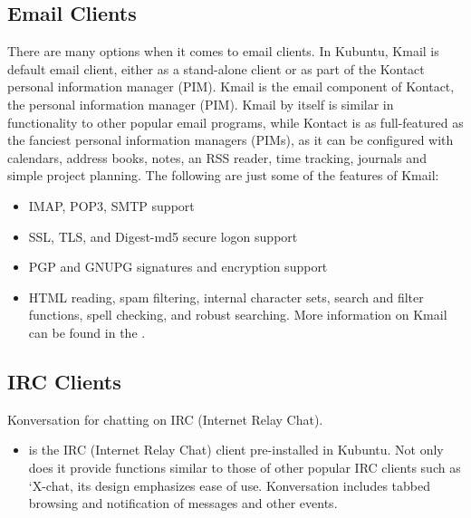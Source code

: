 \documentclass[letterpaper,10pt,english]{sphinxmanual}
\begin{document}
\subsection{Email Clients}
\label{\detokenize{docs/software:email-clients}}
There are many options when it comes to email clients. In Kubuntu, Kmail is default email client, either as a stand-alone client or as part of the Kontact personal information manager (PIM). Kmail is the email component of Kontact, the  personal information manager (PIM). Kmail by itself is similar in functionality to other popular email programs, while Kontact is as full-featured as the fanciest personal information managers (PIMs), as it can be configured with calendars, address books, notes, an RSS reader, time tracking, journals and simple project planning. The following are just some of the features of Kmail:
\begin{itemize}
\item {} 
IMAP, POP3, SMTP support

\item {} 
SSL, TLS, and Digest-md5 secure logon support

\item {} 
PGP and GNUPG signatures and encryption support

\item {} 
HTML reading, spam filtering, internal character sets, search and filter functions, spell checking, and robust searching. More information on Kmail can be found in the .

\end{itemize}


\subsection{IRC Clients}
\label{\detokenize{docs/software:irc-clients}}
Konversation for chatting on IRC (Internet Relay Chat).
\begin{itemize}
\item {} 
 is the IRC (Internet Relay Chat) client pre-installed in Kubuntu. Not only does it provide functions similar to those of other popular IRC clients such as ‘X-chat, its design emphasizes ease of use. Konversation includes tabbed browsing and notification of messages and other events.

\end{itemize}
\end{document}
